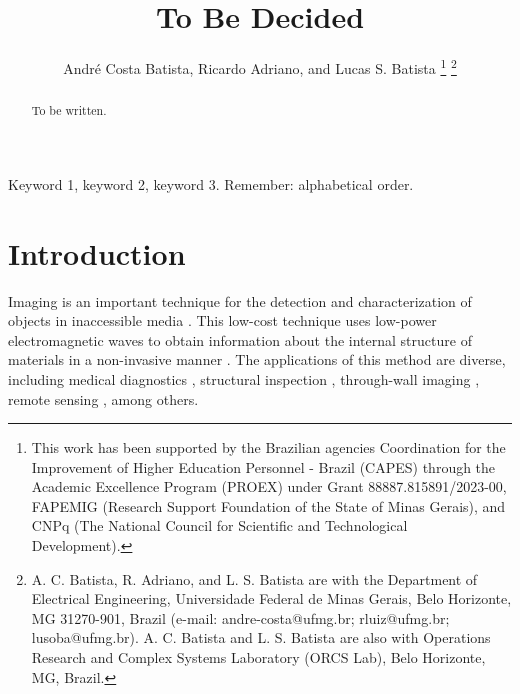 \documentclass{IEEEtran}
\begin{document}
    \title{To Be Decided}
    \author{Andr\'e Costa Batista, Ricardo Adriano, and Lucas S. Batista
        \thanks{This work has been supported by the Brazilian agencies Coordination for the Improvement of Higher Education Personnel - Brazil (CAPES) through the Academic Excellence Program (PROEX) under Grant 88887.815891/2023-00, FAPEMIG (Research Support Foundation of the State of Minas Gerais), and CNPq (The National Council for Scientific and Technological Development).}
        \thanks{A. C. Batista, R. Adriano, and L. S. Batista are with the Department of Electrical Engineering, Universidade Federal de Minas Gerais, Belo Horizonte, MG 31270-901, Brazil (e-mail: andre-costa@ufmg.br; rluiz@ufmg.br; lusoba@ufmg.br). A. C. Batista and L. S. Batista are also with Operations Research and Complex Systems Laboratory (ORCS Lab), Belo Horizonte, MG, Brazil.}}
   
    \maketitle
    
    \begin{abstract}
        To be written.
    \end{abstract}
    
    \begin{IEEEkeywords}
        Keyword 1, keyword 2, keyword 3. Remember: alphabetical order.
    \end{IEEEkeywords}
    
    \section{Introduction}\label{sec:introduction}


         Imaging is an important technique for the detection and characterization of objects in inaccessible media \cite{pastorino2010microwave}. This low-cost technique uses low-power electromagnetic waves to obtain information about the internal structure of materials in a non-invasive manner \cite{godinho2025evaluation}. The applications of this method are diverse, including medical diagnostics \cite{mojabi2025microwave}, structural inspection \cite{fedeli2025mild}, through-wall imaging \cite{fedeli2020through}, remote sensing \cite{salucci2017multifrequency}, among others.
\end{document}
